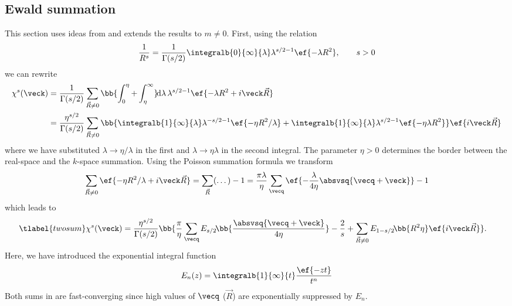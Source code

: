 \subsection{Ewald summation}
This section uses ideas from  and extends the results to $m\ne 0$.
First, using the relation
\begin{align}
    \frac{1}{R^s}=\frac{1}{\Gamma(s/2)} \integralb{0}{\infty}{\lambda} \lambda^{s/2-1} \ef{-\lambda R^2},\qquad s>0
\end{align}
we can rewrite
\begin{align}
    \chi^s(\veck)&=\frac{1}{\Gamma(s/2)}\sum_{\vec{R}\ne 0} \bb{\int_0^\eta + \int_\eta^\infty}\! \mathrm{d}\lambda\, \lambda^{s/2-1} \ef{-\lambda R^2 + i \veck \vec{R}} \\
                 &= \frac{\eta^{s/2}}{\Gamma(s/2)}\sum_{\vec{R}\ne 0} \bb{\integralb{1}{\infty}{\lambda} \lambda^{-s/2-1} \ef{-\eta R^2 / \lambda} + \integralb{1}{\infty}{\lambda} \lambda^{s/2-1} \ef{-\eta \lambda R^2}} \ef{i\veck \vec{R}}
\end{align}
where we have substituted $\lambda \rightarrow \eta/\lambda$ in the first and $\lambda \rightarrow \eta \lambda$ in the second integral.
The parameter $\eta > 0$ determines the border between the real-space and the $k$-space summation.
Using the Poisson summation formula we transform
\begin{align}
    \sum_{\vec{R}\ne 0} \ef{-\eta R^2/\lambda + i \veck \vec{R}} = \sum_{\vec{R}} (\dots) - 1 = \frac{\pi\lambda}{\eta} \sum_{\vecq} \ef{-\frac{\lambda}{4\eta} \absvsq{\vecq+\veck}} - 1
\end{align}
which leads to
\begin{align} \tlabel{twosum}
    \chi^s(\veck) &= \frac{\eta^{s/2}}{\Gamma(s/2)} \bb{\frac{\pi}{\eta} \sum_{\vecq} E_{s/2}\!\bb{\frac{\absvsq{\vecq+\veck}}{4\eta}} - \frac{2}{s} + \sum_{\vec{R}\ne 0} E_{1-s/2}\!\bb{R^2 \eta} \ef{i \veck \vec{R}} }.
\end{align}
Here, we have introduced the exponential integral function
\begin{align}
    E_n(z) = \integralb{1}{\infty}{t} \frac{\ef{-z t}}{t^n}
\end{align}
Both sums in  are fast-converging since high
values of $\vecq$ ($\vec{R}$) are exponentially suppressed by $E_n$.

